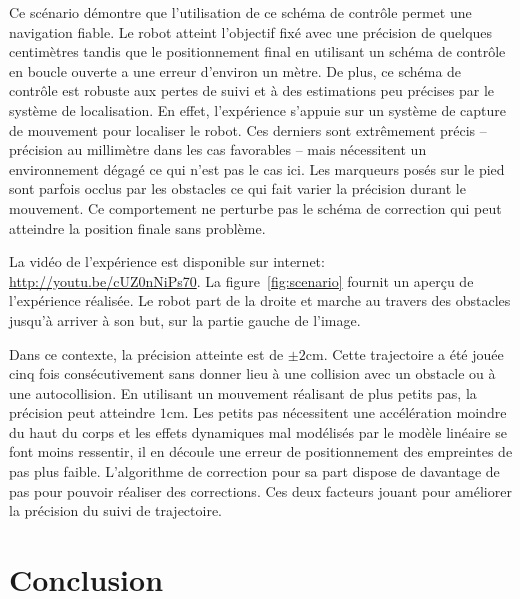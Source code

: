 Ce scénario démontre que l'utilisation de ce schéma de contrôle permet
une navigation fiable. Le robot atteint l'objectif fixé avec une
précision de quelques centimètres tandis que le positionnement final
en utilisant un schéma de contrôle en boucle ouverte a une erreur
d'environ un mètre. De plus, ce schéma de contrôle est robuste aux
pertes de suivi et à des estimations peu précises par le système de
localisation. En effet, l'expérience s'appuie sur un système de
capture de mouvement pour localiser le robot. Ces derniers sont
extrêmement précis -- précision au millimètre dans les cas favorables
-- mais nécessitent un environnement dégagé ce qui n'est pas le cas
ici. Les marqueurs posés sur le pied sont parfois occlus par les
obstacles ce qui fait varier la précision durant le mouvement. Ce
comportement ne perturbe pas le schéma de correction qui peut
atteindre la position finale sans problème.


La vidéo de l'expérience est disponible sur internet:
\mbox{\url{http://youtu.be/cUZ0nNiPs70}}. La figure \ref{fig:scenario}
fournit un aperçu de l'expérience réalisée. Le robot part de la droite
et marche au travers des obstacles jusqu'à arriver à son but, sur la
partie gauche de l'image.

Dans ce contexte, la précision atteinte est de $\pm 2
\mathrm{cm}$. Cette trajectoire a été jouée cinq fois consécutivement
sans donner lieu à une collision avec un obstacle ou à une
autocollision. En utilisant un mouvement réalisant de plus petits pas,
la précision peut atteindre $1 \mathrm{cm}$. Les petits pas
nécessitent une accélération moindre du haut du corps et les effets
dynamiques mal modélisés par le modèle linéaire se font moins
ressentir, il en découle une erreur de positionnement des empreintes
de pas plus faible. L'algorithme de correction pour sa part dispose de
davantage de pas pour pouvoir réaliser des corrections. Ces deux
facteurs jouant pour améliorer la précision du suivi de trajectoire.


\section{Conclusion}\label{conclusion}


